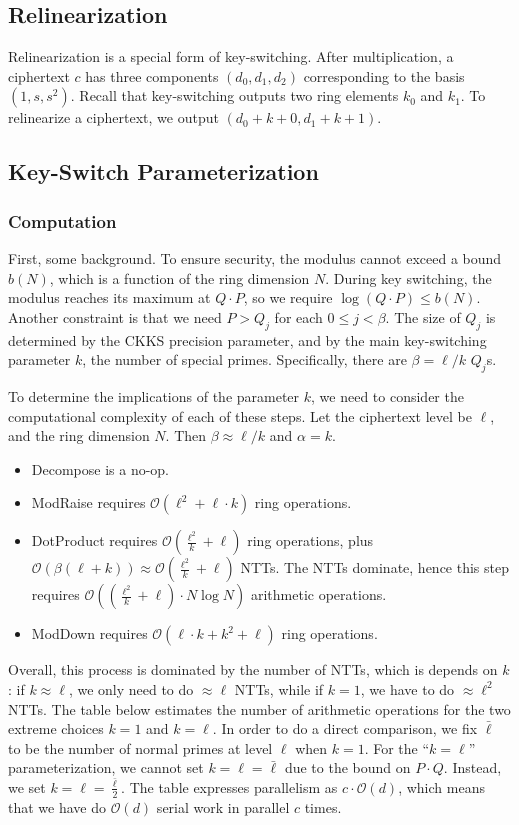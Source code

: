 \documentclass[../../fheimpl.tex]{subfiles}
\begin{document}
\subsection{Relinearization}
Relinearization is a special form of key-switching. After multiplication, a ciphertext $c$ has three components $(d_0, d_1, d_2)$ corresponding to the basis $(1, s, s^2)$. Recall that key-switching outputs two ring elements $k_0$ and $k_1$. To relinearize a ciphertext, we output $(d_0+k+0, d_1+k+1)$.

\subsection{Key-Switch Parameterization}
\subsubsection{Computation}
First, some background. To ensure security, the modulus cannot exceed a bound $b(N)$, which is a function of the ring dimension $N$. During key switching, the modulus reaches its maximum at $Q\cdot P$, so we require $\log{(Q\cdot P)}\le b(N)$. Another constraint is that we need $P > Q_j$ for each $0\le j<\beta$. The size of $Q_j$ is determined by the CKKS precision parameter, and by the main key-switching parameter $k$, the number of special primes. Specifically, there are $\beta=\ell/k$ $Q_j$s. 

To determine the implications of the parameter $k$, we need to consider the computational complexity of each of these steps. Let the ciphertext level be $\ell$, and the ring dimension $N$. Then $\beta\approx \ell/k$ and $\alpha =k$.
\begin{itemize}
	\item Decompose is a no-op.
	\item ModRaise requires $\mathcal{O}(\ell^2 + \ell\cdot k)$ ring operations.
	\item DotProduct requires $\mathcal{O}(\frac{\ell^2}{k}+\ell)$ ring operations, plus $\mathcal{O}(\beta(\ell+k))\approx \mathcal{O}(\frac{\ell^2}{k}+\ell)$ NTTs. The NTTs dominate, hence this step requires $\mathcal{O}((\frac{\ell^2}{k}+\ell)\cdot N\log N)$ arithmetic operations.
	\item ModDown requires $\mathcal{O}(\ell\cdot k + k^2 + \ell)$ ring operations.
\end{itemize}

Overall, this process is dominated by the number of NTTs, which is depends on $k$: if $k\approx \ell$, we only need to do $\approx \ell$ NTTs, while if $k=1$, we have to do $\approx \ell^2$ NTTs. The table below estimates the number of arithmetic operations for the two extreme choices $k=1$ and $k=\ell$. In order to do a direct comparison, we fix $\bar{\ell}$ to be the number of normal primes at level $\ell$ when $k=1$. For the ``$k=\ell$'' parameterization, we cannot set $k=\ell=\bar{\ell}$ due to the bound on $P\cdot Q$. Instead, we set $k=\ell=\frac{\bar{\ell}}{2}$. The table expresses parallelism as $c\cdot \mathcal{O}(d)$, which means that we have do $\mathcal{O}(d)$ serial work in parallel $c$ times.
\end{document}
